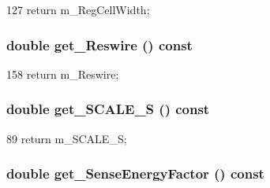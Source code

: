 \begin{DoxyCode}
127 { return m_RegCellWidth; }
\end{DoxyCode}
\hypertarget{classTechParameter_a4f5da329c1d512ec23a66c4f0640fb9d}{
\subsubsection[{get\_\-Reswire}]{\setlength{\rightskip}{0pt plus 5cm}double get\_\-Reswire () const}}
\label{classTechParameter_a4f5da329c1d512ec23a66c4f0640fb9d}



\begin{DoxyCode}
158 { return m_Reswire; }
\end{DoxyCode}
\hypertarget{classTechParameter_a145ed0d2c7438ff32619d28abaa75ba1}{
\subsubsection[{get\_\-SCALE\_\-S}]{\setlength{\rightskip}{0pt plus 5cm}double get\_\-SCALE\_\-S () const}}
\label{classTechParameter_a145ed0d2c7438ff32619d28abaa75ba1}



\begin{DoxyCode}
89 { return m_SCALE_S; }
\end{DoxyCode}
\hypertarget{classTechParameter_a9148ed63f7966f6116ff77c0015466b9}{
\subsubsection[{get\_\-SenseEnergyFactor}]{\setlength{\rightskip}{0pt plus 5cm}double get\_\-SenseEnergyFactor () const}}
\label{classTechParameter_a9148ed63f7966f6116ff77c0015466b9}



